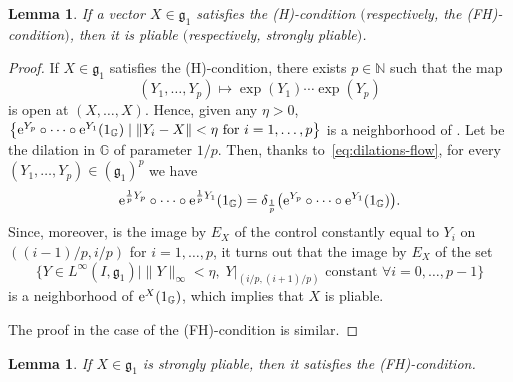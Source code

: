\documentclass[10pt,a4paper]{amsart}
\numberwithin{equation}{section}
\newtheorem{Lemma}[Theorem]{Lemma}
\theoremstyle{definition}
\begin{document}
\begin{Lemma}\label{lem:iii)-->i)}
 If a vector $X\in{\mathfrak g}_1$ satisfies the {\rm (H)}-condition $($respectively, the {\rm (FH)}-condition$)$, then it is pliable $($respectively, strongly pliable$)$.
\end{Lemma}

\begin{proof}
If $X\in {\mathfrak g}_1$ satisfies the (H)-condition, there exists $p\in\mathbb{N}$ such that the map
 \begin{equation*}
 (Y_1,\dots,Y_p)\mapsto \exp(Y_{1}) \cdots \exp(Y_{p})
 \end{equation*}
 is open at $(X,\dots,X)$.
Hence, given any $\eta>0$,
$\bigl\{ {\rm e}^{Y_{p}}\circ \dots \circ {\rm e}^{Y_{1}}(1_{\mathbb{G}}) \mid \|Y_i-X\|<\eta\mbox{ for }i=1,\dots,p\bigr\}$
is a neighborhood of . Let  be the dilation in $\mathbb{G}$ of parameter $1/p$. Then, thanks to~\eqref{eq:dilations-flow}, for every $(Y_1,\dots,Y_p)\in ({\mathfrak g}_1)^p$ we have
\[{\rm e}^{{\frac 1p}Y_{p}}\circ \dots \circ {\rm e}^{{\frac 1p}Y_{1}}(1_\mathbb{G}) = \delta_{\frac 1p}\bigl({\rm e}^{Y_{p}}\circ \dots \circ {\rm e}^{Y_{1}}(1_\mathbb{G})\bigr).\]
Since, moreover,  is the image by $E_X$ of the control constantly equal to $Y_i$ on $((i-1)/p,i/p)$ for $i=1,\dots,p$, it turns out that
the
image by $E_X$
of the set
\[\bigl\{Y\in L^{\infty}(I,{\mathfrak g}_1)\mid \|Y\|_\infty<\eta,\;Y|_{(i/p,(i+1)/p)}\mbox{ constant }\forall i=0,\dots,p-1\bigr\}\]
is
a neighborhood of ${\rm e}^{X}(1_\mathbb{G})$, which implies that $X$ is pliable.

The proof in the case of the (FH)-condition is similar.
\end{proof}

\begin{Lemma}\label{lem:strongly pliable implies weak-strong H}
If $X\in {\mathfrak g}_1$ is strongly pliable, then it satisfies the {\rm (FH)}-condition.
\end{Lemma}
\end{document}
